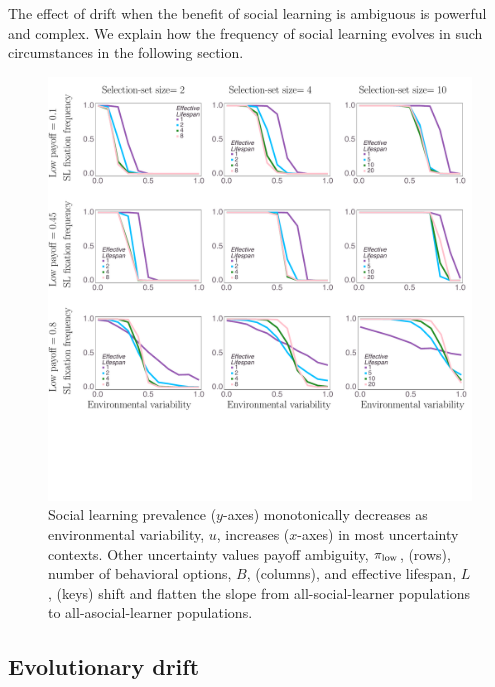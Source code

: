 \documentclass[letterpaper,11.5pt]{scrartcl}
\newcommand{\cm}[1]{{\textcolor{mypurple} {({\tiny CM:} #1)}}}
\begin{document}
The effect of drift when the benefit of social learning is ambiguous is powerful and complex. We explain how the frequency of social learning evolves in such circumstances in the following section.



\begin{figure}
  \caption{Social learning prevalence ($y$-axes) monotonically decreases as 
  environmental variability, $u$, increases ($x$-axes) in most uncertainty contexts. 
  Other uncertainty values payoff ambiguity, $\pi_{\mathrm{low}}$, (rows), number of behavioral options, $B$, (columns), and effective lifespan, $L$, (keys) shift and flatten the slope from all-social-learner populations to all-asocial-learner
  populations.}
  \label{fig:mainResults}
  \centering
    \includegraphics[width=\textwidth]{Figures/mainResultsPlots.pdf}
\end{figure}

\subsection{Evolutionary drift}
\end{document}
